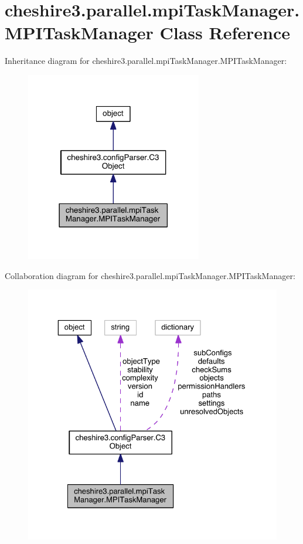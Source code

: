\hypertarget{classcheshire3_1_1parallel_1_1mpi_task_manager_1_1_m_p_i_task_manager}{\section{cheshire3.\-parallel.\-mpi\-Task\-Manager.\-M\-P\-I\-Task\-Manager Class Reference}
\label{classcheshire3_1_1parallel_1_1mpi_task_manager_1_1_m_p_i_task_manager}
}


Inheritance diagram for cheshire3.\-parallel.\-mpi\-Task\-Manager.\-M\-P\-I\-Task\-Manager\-:
\nopagebreak
\begin{figure}[H]
\begin{center}
\leavevmode
\includegraphics[width=218pt]{classcheshire3_1_1parallel_1_1mpi_task_manager_1_1_m_p_i_task_manager__inherit__graph}
\end{center}
\end{figure}


Collaboration diagram for cheshire3.\-parallel.\-mpi\-Task\-Manager.\-M\-P\-I\-Task\-Manager\-:
\nopagebreak
\begin{figure}[H]
\begin{center}
\leavevmode
\includegraphics[width=325pt]{classcheshire3_1_1parallel_1_1mpi_task_manager_1_1_m_p_i_task_manager__coll__graph}
\end{center}
\end{figure}
